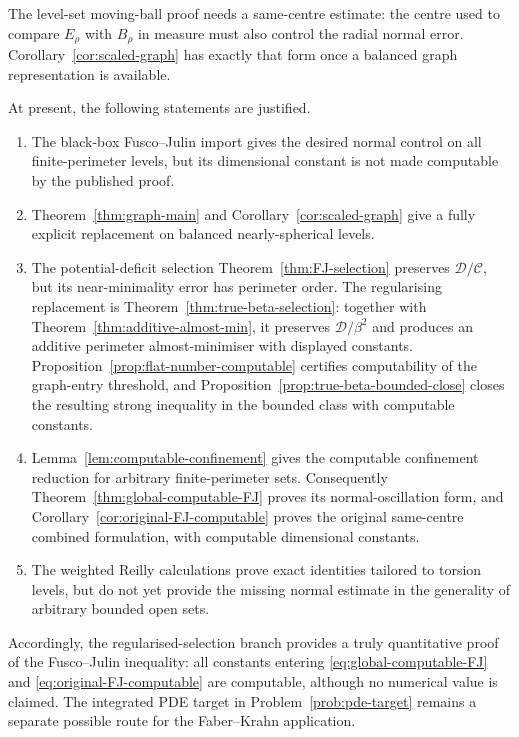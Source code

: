 \documentclass[11pt]{amsart}
\theoremstyle{definition}
\newcommand{\Def}{\mathcal D}
\begin{document}
The level-set moving-ball proof needs a same-centre estimate: the centre used
to compare \(E_\rho\) with \(B_\rho\) in measure must also control the radial
normal error.  Corollary~\ref{cor:scaled-graph} has exactly that form once a
balanced graph representation is available.

At present, the following statements are justified.
\begin{enumerate}[label=\textnormal{(\arabic*)},leftmargin=2.6em]
\item The black-box Fusco--Julin import gives the desired normal control on
all finite-perimeter levels, but its dimensional constant is not made
computable by the published proof.
\item Theorem~\ref{thm:graph-main} and Corollary~\ref{cor:scaled-graph} give a
fully explicit replacement on balanced nearly-spherical levels.
\item The potential-deficit selection
Theorem~\ref{thm:FJ-selection} preserves \(\Def/\mathcal C\), but its
near-minimality error has perimeter order.  The regularising replacement is
Theorem~\ref{thm:true-beta-selection}: together with
Theorem~\ref{thm:additive-almost-min}, it preserves
\(\Def/\beta^2\) and produces an additive perimeter almost-minimiser with
displayed constants.  Proposition~\ref{prop:flat-number-computable}
certifies computability of the graph-entry threshold, and
Proposition~\ref{prop:true-beta-bounded-close} closes the resulting
strong inequality in the bounded class with computable constants.
\item Lemma~\ref{lem:computable-confinement} gives the computable
confinement reduction for arbitrary finite-perimeter sets.  Consequently
Theorem~\ref{thm:global-computable-FJ} proves its normal-oscillation form,
and Corollary~\ref{cor:original-FJ-computable} proves the original
same-centre combined formulation, with computable dimensional constants.
\item The weighted Reilly calculations prove exact identities tailored to
torsion levels, but do not yet provide the missing normal estimate in the
generality of arbitrary bounded open sets.
\end{enumerate}

Accordingly, the regularised-selection branch provides a truly quantitative
proof of the Fusco--Julin inequality: all constants entering
\eqref{eq:global-computable-FJ} and \eqref{eq:original-FJ-computable} are
computable, although no numerical value is claimed.  The integrated PDE
target in Problem~\ref{prob:pde-target} remains a separate possible route
for the Faber--Krahn application.
\end{document}
